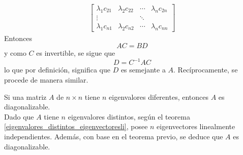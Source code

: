\begin{theorem}
\begin{align*}
\begin{bmatrix}
            \lambda_1c_{21} & \lambda_2c_{22} & \cdots & \lambda_nc_{2n} \\
            \vdots & & \ddots & \\
            \lambda_1c_{n1} & \lambda_2c_{n2} & \cdots & \lambda_nc_{nn}
        \end{bmatrix}
    \end{align*}
    Entonces
    $$AC = BD$$
    y como $C$ es invertible, se sigue que
    $$D = C^{-1}AC$$
    lo que por definición, significa que $D$ es semejante a $A$. Recíprocamente, se procede de manera similar.
\end{theorem}

\begin{theorem}
    Si una matriz $A$ de $n \times n$ tiene $n$ eigenvalores diferentes, entonces $A$ es diagonalizable. \\
    \demostracion Dado que $A$ tiene $n$ eigenvalores distintos, según el teorema \ref{eigenvalores_distintos_eigenvectoresli}, posee $n$ eigenvectores linealmente independientes. Además, con base en el teorema previo, se deduce que $A$ es diagonalizable.
\end{theorem}

\newpage

